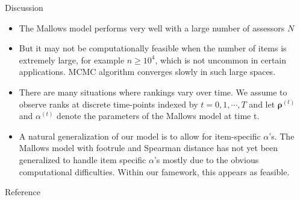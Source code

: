 \documentclass[11pt]{beamer}
\begin{document}
\begin{frame}{Discussion}
\begin{itemize}
    \item The Mallows model performs very well with a large number of assessors $N$
    \item But it may not be computationally feasible when the number of items is extremely large, for example $n\geq 10^4$, which is not uncommon in certain applications. MCMC algorithm converges slowly in such large spaces.
    \item There are many situations where rankings vary over time. We assume to observe ranks at discrete time-points indexed by $t=0,1,\cdots, T$ and let $\boldsymbol{\rho}^{(t)}$ and $\alpha^{(t)}$ denote the parameters of the Mallows model at time t.
    \item A natural generalization of our model is to allow for item-specific $\alpha$'s. The Mallows model with footrule and Spearman distance has not yet been generalized to handle item specific $\alpha$'s mostly due to the obvious computational difficulties. Within our famework, this appears as feasible.  
\end{itemize}
\end{frame}


\begin{frame}{Reference}
    \nocite{vitelli2017probabilistic}
    
\end{frame}
\end{document}
